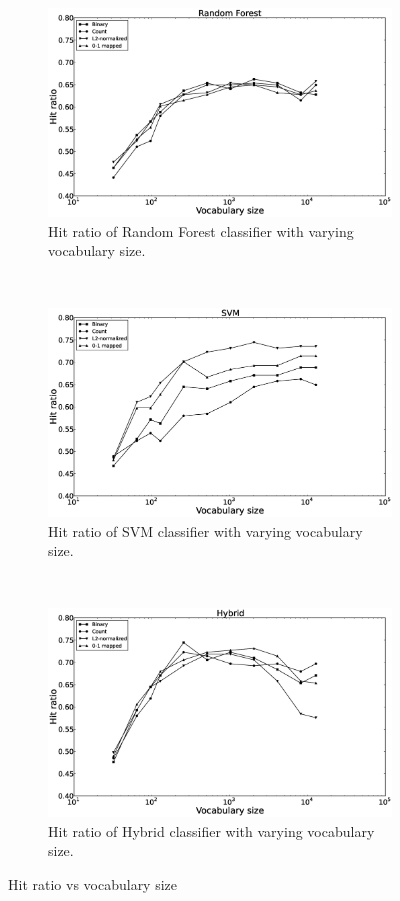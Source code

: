 \begin{figure}[H]
\begin{subfigure}[b]{\figwidth}
		\includegraphics[width=\textwidth]{Random-Forest-hitrate.eps}
		\caption{Hit ratio of Random Forest classifier with varying vocabulary size.}
		\label{fig:hitrate-rf}
	\end{subfigure}
	~
	\begin{subfigure}[b]{\figwidth}
		\includegraphics[width=\textwidth]{SVM-hitrate.eps}
		\caption{Hit ratio of SVM classifier with varying vocabulary size.}
		\label{fig:hitrate-svm}
	\end{subfigure}
	\\
	\begin{subfigure}[b]{\figwidth}
		\includegraphics[width=\textwidth]{Hybrid-hitrate.eps}
		\caption{Hit ratio of Hybrid classifier with varying vocabulary size.}
		\label{fig:hitrate-hybrid}
	\end{subfigure}
	\caption{Hit ratio vs vocabulary size}
	\label{fig:hitrate}
\end{figure}

